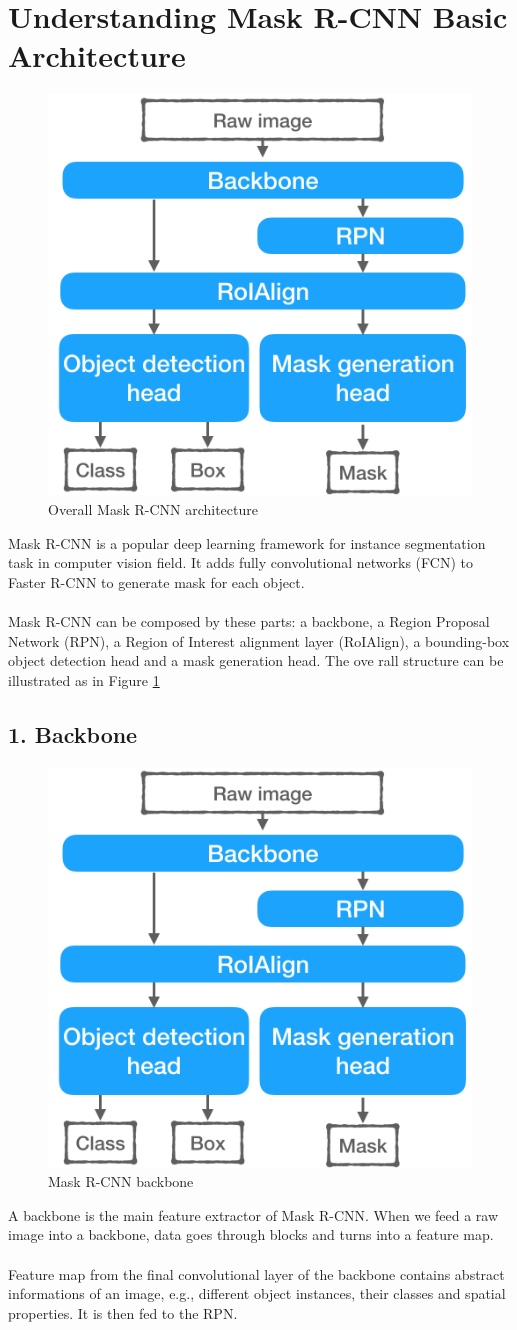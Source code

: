 \documentclass[a4paper]{report}
\begin{document}
\chapter*{Understanding Mask R-CNN Basic Architecture}
\begin{figure}[h]
    \centering
    \includegraphics[width=0.4 \textwidth]{./entities/maskrcnn-big-picture.png}
    \caption{Overall Mask R-CNN architecture}
    \label{fig:RCNN_overall}
\end{figure}
Mask R-CNN is a popular deep learning framework for instance segmentation task in computer vision field. It adds fully convolutional networks (FCN) to Faster R-CNN to generate mask for each object.
\\
\\
Mask R-CNN can be composed by these parts: a backbone, a Region Proposal Network (RPN), a Region of Interest alignment layer (RoIAlign), a bounding-box object detection head and a mask generation head. The ove rall structure can be illustrated as in Figure \ref{fig:RCNN_overall}

\section*{1. Backbone}
\begin{figure}[h]
    \centering
    \includegraphics[width=0.4 \textwidth]{./entities/maskrcnn-big-picture.png}
    \caption{Mask R-CNN backbone}
    \label{fig:RCNN_backbone}
\end{figure}
A backbone is the main feature extractor of Mask R-CNN. When we feed a raw image into a backbone, data goes through blocks and turns into a feature map.
\\
\\
Feature map from the final convolutional layer of the backbone contains abstract informations of an image, e.g., different object instances, their classes and spatial properties. It is then fed to the RPN.
\end{document}
